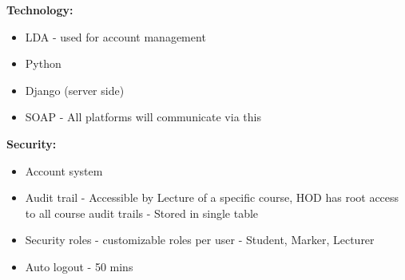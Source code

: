 \documentclass{article}
\begin{document}
\textbf{Technology:}
\begin{itemize}
\item LDA - used for account management
\item Python
\item Django (server side)
\item SOAP - All platforms will communicate via this
\end{itemize}

\textbf{Security:}
\begin{itemize}
\item Account system
\item Audit trail - Accessible by Lecture of a specific course, HOD has root access to all course audit trails - Stored in single table
\item Security roles - customizable roles per user - Student, Marker, Lecturer
\item Auto logout - 50 mins
\end{itemize}
\end{document}
